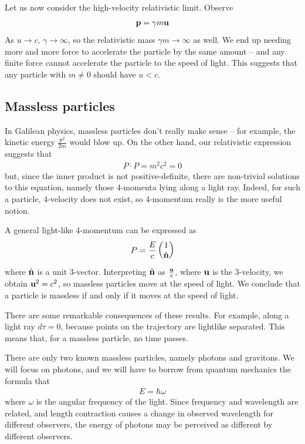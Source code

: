 \documentclass{../template/note}
\begin{document}
    Let us now consider the high-velocity relativistic limit. Observe
    \begin{align*}
        \V p = \gamma m \V u
    \end{align*}
    As \(u \to c\), \(\gamma \to \infty\), so the relativistic mass \(\gamma m \to \infty\) as well. We end up needing more and more force to accelerate the particle by the same amount -- and any finite force cannot accelerate the particle to the speed of light. This suggests that any particle with \(m \neq 0\) should have \(u < c\).
    
    \subsection{Massless particles}

    In Galilean physics, massless particles don't really make sense -- for example, the kinetic energy \(\frac{p^2}{2m}\) would blow up. On the other hand, our relativistic expression suggests that
    \begin{align*}
        P \cdot P = m^2c^2 = 0
    \end{align*}
    but, since the inner product is not positive-definite, there are non-trivial solutions to this equation, namely those 4-momenta lying along a light ray. Indeed, for such a particle, 4-velocity does not exist, so 4-momentum really is the more useful notion.

    A general light-like 4-momentum can be expressed as
    \begin{align*}
        P = \frac E c\begin{pmatrix}
            1 \\
            \hvec n \\
        \end{pmatrix}
    \end{align*}
    where \(\hvec n\) is a unit 3-vector. Interpreting \(\hvec n\) as \(\frac{\V u}c\), where \(\V u\) is the 3-velocity, we obtain \(\V u^2 = c^2\), so massless particles move at the speed of light. We conclude that a particle is massless if and only if it moves at the speed of light.

    There are some remarkable consequences of these results. For example, along a light ray \(d\tau = 0\), because points on the trajectory are lightlike separated. This means that, for a massless particle, no time passes.

    There are only two known massless particles, namely photons and gravitons. We will focus on photons, and we will have to borrow from quantum mechanics the formula that
    \begin{align*}
        E = \hbar \omega
    \end{align*}
    where \(\omega\) is the angular frequency of the light. Since frequency and wavelength are related, and length contraction causes a change in observed wavelength for different observers, the energy of photons may be perceived as different by different observers.
\end{document}
